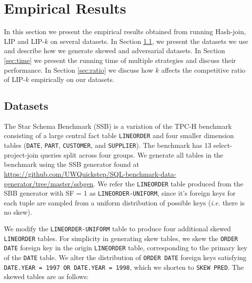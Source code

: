 \section{Empirical Results}\label{sec:experiment}

In this section we present the empirical results obtained from running Hash-join, LIP and LIP-$k$ on several datasets. In Section \ref{sec:dataset}, we present the datasets we use and describe how we generate skewed and adversarial datasets. In Section \ref{sec:time} we present the running time of multiple strategies and discuss their performance. In Section \ref{sec:ratio} we discuss how $k$ affects the competitive ratio of LIP-$k$ empirically on our datasets.

\subsection{Datasets}
\label{sec:dataset}

The Star Schema Benchmark (SSB) is a variation of the TPC-H benchmark 
consisting of a large central fact table \texttt{LINEORDER} and four smaller dimension tables (\texttt{DATE}, \texttt{PART}, \texttt{CUSTOMER}, and \texttt{SUPPLIER}).
The benchmark has 13 select-project-join queries split across four groups. 
We generate all tables in the benchmark using the SSB generator found at \url{https://github.com/UWQuickstep/SQL-benchmark-data-generator/tree/master/ssbgen}.
We refer the \texttt{LINEORDER} table produced from the SBB generator with SF = 1 as \texttt{LINEORDER-UNIFORM}, 
since it's foreign keys for each tuple are sampled from a uniform distribution of possible keys ({\it i.e.} there is no skew).

We modify the \texttt{LINEORDER-UNIFORM} table to produce four additional skewed \texttt{LINEORDER} tables.
For simplicity in generating skew tables, we skew the \texttt{ORDER DATE} foreign key in the origin \texttt{LINEORDER} table, corresponding to the primary key of the \texttt{DATE} table. 
We alter the distribution of \texttt{ORDER DATE} foreign keys satisfying \texttt{DATE.YEAR = 1997 OR DATE.YEAR = 1998}, which we shorten to \texttt{SKEW PRED}.
The skewed tables are as follows:


